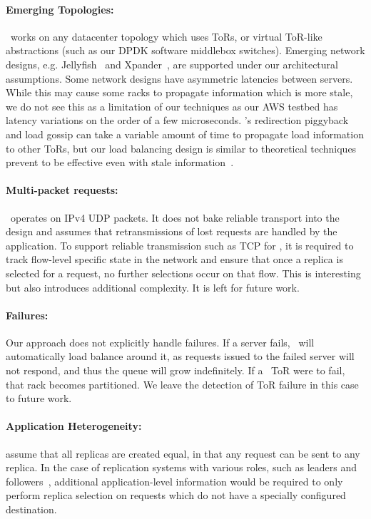 \paragraph{Emerging Topologies:} \daronpon\ works on any datacenter topology
which uses ToRs, or virtual ToR-like abstractions (such as our DPDK software
middlebox switches). Emerging network designs, e.g. Jellyfish~\cite{jellyfish}
and Xpander~\cite{xpander}, are supported under our architectural assumptions.
Some network designs have asymmetric latencies between servers.  While this may
cause some racks to propagate information which is more stale, we do not see
this as a limitation of our techniques as our AWS testbed has latency variations
on the order of a few microseconds.  \daronpon's redirection piggyback and load
gossip can take a variable amount of time to propagate load information to
other ToRs, but our load balancing design is similar to theoretical techniques
prevent to be effective even with stale information~\cite{lsq}. 

\paragraph{Multi-packet requests:} \daronpon\ operates on IPv4 UDP packets. It 
does not bake reliable transport into the design and assumes that
retransmissions of lost requests are handled by the application. To support
reliable transmission such as TCP for \daronpon, it is required to track flow-level specific state in the network and ensure that once a replica is selected for a request, no further selections occur on that flow. This is interesting but also introduces additional complexity. It is left for future work.

\paragraph{Failures:} Our approach does not explicitly handle failures. If a
server fails, \daronpon\ will automatically load balance around it, as requests
issued to the failed server will not respond, and thus the queue will grow
indefinitely. If a \daronpon\ ToR were to fail, that rack becomes partitioned.
We leave the detection of ToR failure in this case to future work.

\paragraph{Application Heterogeneity:} \daronpon assume that all replicas are
created equal, in that any request can be sent to any replica. In the case of
replication systems with various roles, such as leaders and
followers~\cite{raft}, additional application-level information would be
required to only perform replica selection on requests which do not have a
specially configured destination.

